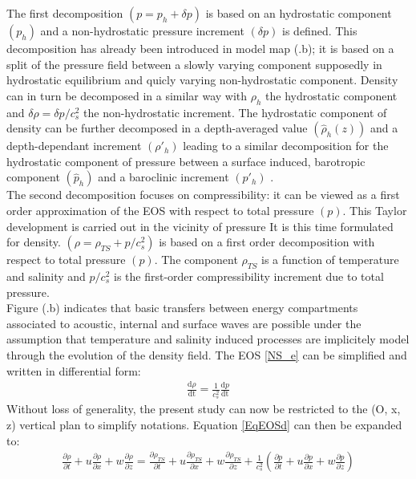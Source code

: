 \documentclass[a4paper,11pt]{article}
\begin{document}
The first decomposition $(p=p_h+\delta p)$ is based on an hydrostatic component $(p_h)$ and a non-hydrostatic pressure increment $(\delta p)$ is defined. This decomposition has already been introduced in model map (.b); it is based on a split of the pressure field between a slowly varying component supposedly in hydrostatic equilibrium and quicly varying non-hydrostatic component. Density can in turn be decomposed in a similar way with $\rho_h$ the hydrostatic component and $\delta \rho=\delta p/c_s^2$ the non-hydrostatic increment. The hydrostatic component of density can be further decomposed in a depth-averaged value $(\hat{\rho}_h(z))$ and a depth-dependant increment $(\rho'_h)$ leading to a similar decomposition for the hydrostatic component of pressure between a surface induced, barotropic component $(\hat{p}_h)$ and a baroclinic increment $(p'_h)$ .\\
The second decomposition focuses on compressibility: it can be viewed as a first order approximation of the EOS with respect to total pressure $(p)$. This Taylor development is carried out in the vicinity of pressure
 It is this time formulated for density.
 $(\rho=\rho_{TS}+p/c_s^2)$ is based on a first order decomposition with respect to total pressure $(p)$. The component $\rho_{TS}$ is a function of temperature and salinity and $p/c_s^2$ is the first-order compressibility increment due to total pressure. \\ 
 Figure (.b) indicates that basic transfers between energy compartments associated to acoustic, internal and surface waves are possible under the assumption that temperature and salinity induced processes are implicitely model through the evolution of the density field.
The EOS \ref{NS_e} can be simplified and written in differential form:
\begin{subequations}
\begin{alignat}{2}
	\displaystyle 
	 \frac{\textrm{d}\rho}{\textrm{dt}}=
	\frac{1}{c_s^2}  \frac{\textrm{d} p}{\textrm{dt}}
	\label{EqEOSd}
\end{alignat}
\end{subequations}
Without loss of generality, the present study can now be restricted to the (O, x, z) vertical plan to simplify notations. Equation \ref{EqEOSd} can then be expanded to:
\begin{subequations}
\begin{alignat}{2}
	\label{EqEOS1}
	\displaystyle 
	 \frac{\partial\rho}{\partial t} 
	 +u \frac{\partial \rho}{\partial x}
	 +w \frac{\partial \rho}{\partial z}=
	 \frac{\partial  \rho_{TS}}{\partial t} 
	 +u \frac{\partial  \rho_{TS}}{\partial x}
	 +w \frac{\partial  \rho_{TS}}{\partial z}
	 +\frac{1}{c_s^2}\left(\frac{\partial p}{\partial t} 
	 +u \frac{\partial p}{\partial x}
	 +w \frac{\partial p}{\partial z}\right)
\end{alignat}
\end{subequations}
\end{document}

